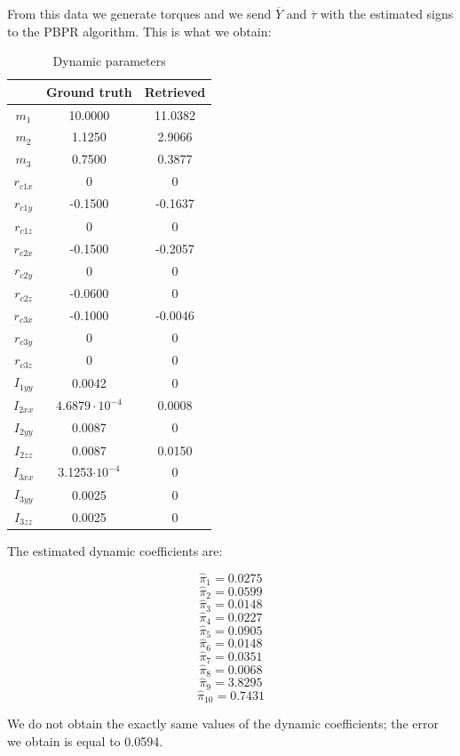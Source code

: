 \documentclass{article}
\begin{document}
From this data we generate torques and we send $\overline{Y}$ and $\overline{\tau}$ with the estimated signs to the PBPR algorithm. This is what we obtain:

\begin{table}[!htbp]
\centering
\begin{tabular}{|c|cc|}
\hline
& Ground truth & Retrieved\\ 
\hline
$m_1$ & 10.0000 & 11.0382\\
$m_2$ & 1.1250 & 2.9066\\
$m_3$ & 0.7500 & 0.3877\\
$r_{c1x}$ &  0 & 0\\
$r_{c1y}$ & -0.1500 & -0.1637\\
$r_{c1z}$ & 0 & 0\\
$r_{c2x}$ & -0.1500 & -0.2057\\
$r_{c2y}$ & 0 & 0\\
$r_{c2z}$ & -0.0600 & 0\\
$r_{c3x}$ & -0.1000 & -0.0046\\
$r_{c3y}$ & 0 & 0\\
$r_{c3z}$ & 0 & 0\\
$I_{1yy}$ & 0.0042 & 0\\
$I_{2xx}$ & $4.6879\cdot 10^{-4}$ & 0.0008\\
$I_{2yy}$ & 0.0087 & 0\\
$I_{2zz}$ & 0.0087 & 0.0150\\
$I_{3xx}$ & 3.1253$\cdot 10^{-4}$ & 0\\
$I_{3yy}$ & 0.0025 & 0\\
$I_{3zz}$ & 0.0025 & 0\\
\hline
\end{tabular}
\caption{Dynamic parameters}
\end{table}
\FloatBarrier

The estimated dynamic coefficients are:

\[\hat{\pi}_1 = 0.0275\]
\[\hat{\pi}_2  = 0.0599\]
\[\hat{\pi}_3 = 0.0148\]
\[\hat{\pi}_4 = 0.0227\]
\[\hat{\pi}_5 = 0.0905\]
\[\hat{\pi}_6 = 0.0148\]
\[\hat{\pi}_7 = 0.0351\]
\[\hat{\pi}_8 = 0.0068\]
\[\hat{\pi}_9 = 3.8295\]
\[\hat{\pi}_{10} = 0.7431\]

We do not obtain the exactly same values of the dynamic coefficients; the error we obtain is equal to 0.0594.
\end{document}
